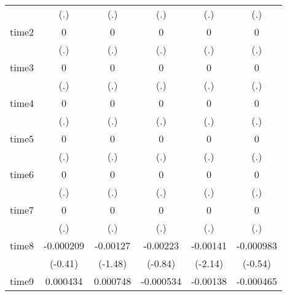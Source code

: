 \begin{table}[htbp]
\begin{tabular}{l*{5}{c}}
            &         (.)         &         (.)         &         (.)         &         (.)         &         (.)         \\
time2       &           0         &           0         &           0         &           0         &           0         \\
            &         (.)         &         (.)         &         (.)         &         (.)         &         (.)         \\
time3       &           0         &           0         &           0         &           0         &           0         \\
            &         (.)         &         (.)         &         (.)         &         (.)         &         (.)         \\
time4       &           0         &           0         &           0         &           0         &           0         \\
            &         (.)         &         (.)         &         (.)         &         (.)         &         (.)         \\
time5       &           0         &           0         &           0         &           0         &           0         \\
            &         (.)         &         (.)         &         (.)         &         (.)         &         (.)         \\
time6       &           0         &           0         &           0         &           0         &           0         \\
            &         (.)         &         (.)         &         (.)         &         (.)         &         (.)         \\
time7       &           0         &           0         &           0         &           0         &           0         \\
            &         (.)         &         (.)         &         (.)         &         (.)         &         (.)         \\
time8       &   -0.000209         &    -0.00127         &    -0.00223         &    -0.00141\sym{*}  &   -0.000983         \\
            &     (-0.41)         &     (-1.48)         &     (-0.84)         &     (-2.14)         &     (-0.54)         \\
time9       &    0.000434         &    0.000748         &   -0.000534         &    -0.00138\sym{**} &   -0.000465         \\

\end{tabular}
\end{table}

